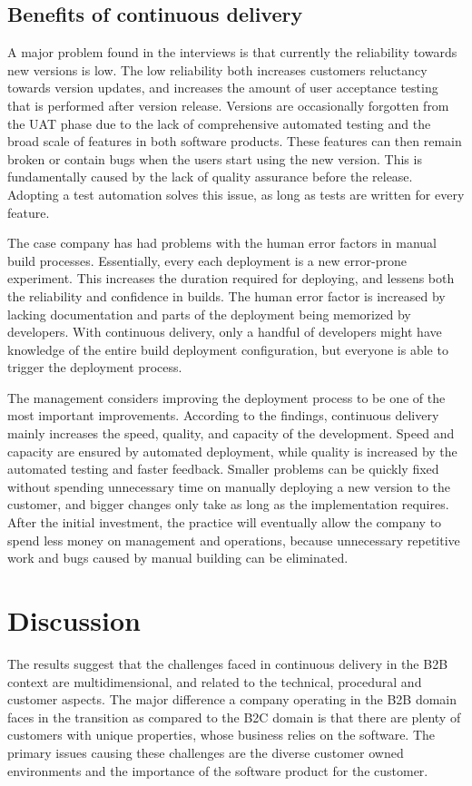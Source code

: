 \documentclass[lnbip]{svmultln}
\begin{document}
\subsection{Benefits of continuous delivery}
A major problem found in the interviews is that currently the reliability towards new versions is low. The low reliability both increases customers reluctancy towards version updates, and increases the amount of user acceptance testing that is performed after version release. Versions are occasionally forgotten from the UAT phase due to the lack of comprehensive automated testing and the broad scale of features in both software products. These features can then remain broken or contain bugs when the users start using the new version. This is fundamentally caused by the lack of quality assurance before the release. Adopting a test automation solves this issue, as long as tests are written for every feature.

The case company has had problems with the human error factors in manual build processes. Essentially, every each deployment is a new error-prone experiment. This increases the duration required for deploying, and lessens both the reliability and confidence in builds. The human error factor is increased by lacking documentation and parts of the deployment being memorized by developers. With continuous delivery, only a handful of developers might have knowledge of the entire build deployment configuration, but everyone is able to trigger the deployment process. 

The management considers improving the deployment process to be one of the most important improvements. According to the findings, continuous delivery mainly increases the speed, quality, and capacity of the development. Speed and capacity are ensured by automated deployment, while quality is increased by the automated testing and faster feedback. Smaller problems can be quickly fixed without spending unnecessary time on manually deploying a new version to the customer, and bigger changes only take as long as the implementation requires. After the initial investment, the practice will eventually allow the company to spend less money on management and operations, because unnecessary repetitive work and bugs caused by manual building can be eliminated. %

\section{Discussion}
The results suggest that the challenges faced in continuous delivery in the B2B context are multidimensional, and related to the technical, procedural and customer aspects. The major difference a company operating in the B2B domain faces in the transition as compared to the B2C domain is that there are plenty of customers with unique properties, whose business relies on the software. The primary issues causing these challenges are the diverse customer owned environments and the importance of the software product for the customer. 
\end{document}

